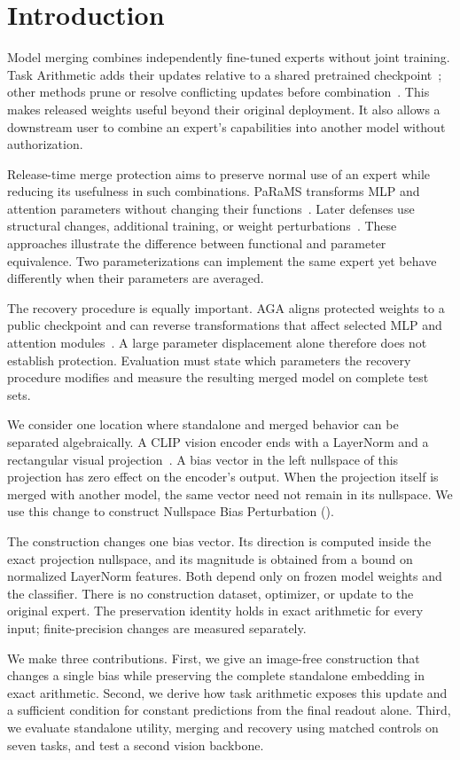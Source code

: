 \section{Introduction}
Model merging combines independently fine-tuned experts without joint training. Task Arithmetic adds their updates relative to a shared pretrained checkpoint~\cite{ilharco2023task}; other methods prune or resolve conflicting updates before combination~\cite{yadav2023ties,yu2024dare}. This makes released weights useful beyond their original deployment. It also allows a downstream user to combine an expert's capabilities into another model without authorization.

Release-time merge protection aims to preserve normal use of an expert while reducing its usefulness in such combinations. PaRaMS transforms MLP and attention parameters without changing their functions~\cite{wei2025params}. Later defenses use structural changes, additional training, or weight perturbations~\cite{li2025mergebarrier,chen2026mergeguard,jang2026trap2}. These approaches illustrate the difference between functional and parameter equivalence. Two parameterizations can implement the same expert yet behave differently when their parameters are averaged.

The recovery procedure is equally important. AGA aligns protected weights to a public checkpoint and can reverse transformations that affect selected MLP and attention modules~\cite{guo2026aga}. A large parameter displacement alone therefore does not establish protection. Evaluation must state which parameters the recovery procedure modifies and measure the resulting merged model on complete test sets.

We consider one location where standalone and merged behavior can be separated algebraically. A CLIP vision encoder ends with a LayerNorm and a rectangular visual projection~\cite{radford2021clip}. A bias vector in the left nullspace of this projection has zero effect on the encoder's output. When the projection itself is merged with another model, the same vector need not remain in its nullspace. We use this change to construct Nullspace Bias Perturbation (\method).

The construction changes one bias vector. Its direction is computed inside the exact projection nullspace, and its magnitude is obtained from a bound on normalized LayerNorm features. Both depend only on frozen model weights and the classifier. There is no construction dataset, optimizer, or update to the original expert. The preservation identity holds in exact arithmetic for every input; finite-precision changes are measured separately.

We make three contributions. First, we give an image-free construction that changes a single bias while preserving the complete standalone embedding in exact arithmetic. Second, we derive how task arithmetic exposes this update and a sufficient condition for constant predictions from the final readout alone. Third, we evaluate standalone utility, merging and recovery using matched controls on seven tasks, and test a second vision backbone.
